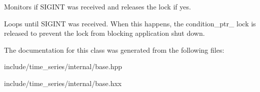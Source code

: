 Monitors if S\+I\+G\+I\+NT was received and releases the lock if yes. 

Loops until S\+I\+G\+I\+NT was received. When this happens, the condition\+\_\+ptr\+\_\+ lock is released to prevent the lock from blocking application shut down. 

The documentation for this class was generated from the following files\+:\begin{DoxyCompactItemize}
\item 
include/time\+\_\+series/internal/base.\+hpp\item 
include/time\+\_\+series/internal/base.\+hxx\end{DoxyCompactItemize}
